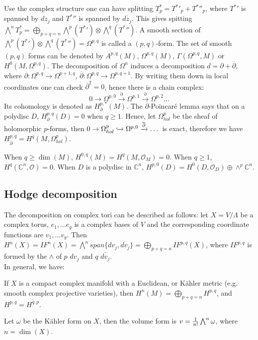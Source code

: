 Use the complex structure one can have splitting $T^*_p={T^*}'_p+{T^*}{''}_p$, where ${T^*}'$ is spanned by $dz_j$ and ${T^*}{''}$ is spanned by $\overline{dz_j}$. This gives spitting $\bigwedge^nT^*_p=\bigoplus_{p+q=n}\bigwedge^p({T^*}')\otimes \bigwedge^q({T^*}{''})$. A smooth section of $\bigwedge^p({T^*}')\otimes \bigwedge^q({T^*}{''})=\Omega^{p,q}$ is called a $(p,q)$-form. The set of smooth $(p,q)$ forms can be denoted by $A^{p,q}(M)$, $\Omega^{p,q}(M)$, $\Gamma(\Omega^{p,q},M)$ or $H^0(M,\Omega^{p,q})$. The decomposition of $\Omega^n$ induces a decomposition $d=\partial+\overline{\partial}$, where $\partial: \Omega^{p,q}\rightarrow\Omega^{p+1,q}$, $\overline{\partial}:\Omega^{p,q}\rightarrow\Omega^{p,q+1}$. By writing them down in local coordinates one can check $\overline{\partial}^2=0$, hence there is a chain complex:
$$0\rightarrow\Omega^{p,0}\xrightarrow{\partial}\Omega^{p,1}\xrightarrow{\partial}\Omega^{p,2}\dots$$
Its cohomology is denoted as $H^{p,*}_\partial(M)$. 
The $\overline{\partial}$-Poincar\'e lemma says that on a polydisc $D$, $H^{p,q}_\partial(D)=0$ when $q\geq 1$. Hence, let $\Omega^p_{hol}$ be the sheaf of holomorphic $p$-forms, then $0\rightarrow\Omega^p_{hol}\xhookrightarrow{}\Omega^{p,0}\xrightarrow{\overline{\partial}}\dots$ is exact, therefore we have $H^{p,q}_{\overline{\partial}}=H^q(M,\Omega^p_{hol})$. \\

\begin{example}
When $q\geq\dim(M)$, $H^{0,q}(M)=H^q(M,\mathcal{O}_M)=0$. When $q\geq 1$, $H^q(\mathbb{C}^n,\mathcal{O})=0$. When $D$ is a polydisc in $\mathbb{C}^n$, $H^{p,0}(D)=H^0(D,\mathcal{O}_D)\oplus\wedge^p\mathbb{C}^n$. 	
\end{example}

\subsection{Hodge decomposition}
The decomposition on complex tori can be described as follows: let $X=V/\Lambda$ be a complex torus, $e_1,\dots e_g$ is a complex bases of $V$ and the corresponding coordinate functions are $v_1,\dots v_g$. Then $H^n(X)=IF^n(X)=\bigwedge^n span\{dv_j,\overline{dv_j}\}=\bigoplus_{p+q=n}IF^{p,q}(X)$, where $IF^{p,q}$ is formed by the $\wedge$ of $p$ $dv_j$ and $q$ $\overline{dv_j}$.\\
 
In general, we have: 
\begin{theorem}
	If $X$ is a compact complex manifold with a Euclidean, or K\"ahler metric (e.g. smooth complex projective varieties), then $H^n(M)=\bigoplus_{p+q=n}H^{p,q}$, and $H^{p,q}=\overline{H^{q,p}}$.
\end{theorem}

Let $\omega$ be the K\"ahler form on $X$, then the volume form is $v={1\over n!}\bigwedge^n\omega$, where $n=\dim(X)$.